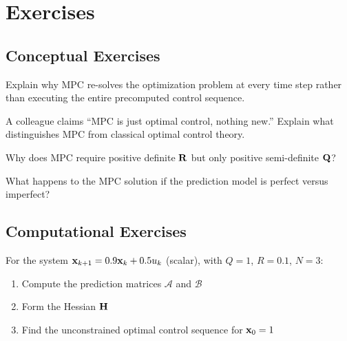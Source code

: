 \newpage
\section{Exercises}
\label{sec:exercises}

\subsection{Conceptual Exercises}

\begin{exercise}
Explain why MPC re-solves the optimization problem at every time step rather than executing the entire precomputed control sequence.
\end{exercise}

\begin{exercise}
A colleague claims ``MPC is just optimal control, nothing new.'' Explain what distinguishes MPC from classical optimal control theory.
\end{exercise}

\begin{exercise}
Why does MPC require positive definite $\mathbf{R}$ but only positive semi-definite $\mathbf{Q}$?
\end{exercise}

\begin{exercise}
What happens to the MPC solution if the prediction model is perfect versus imperfect?
\end{exercise}

\subsection{Computational Exercises}

\begin{exercise}
For the system $\mathbf{x}_{k+1} = 0.9\mathbf{x}_k + 0.5u_k$ (scalar), with $Q=1$, $R=0.1$, $N=3$:
\begin{enumerate}
    \item Compute the prediction matrices $\boldsymbol{\mathcal{A}}$ and $\boldsymbol{\mathcal{B}}$
    \item Form the Hessian $\mathbf{H}$
    \item Find the unconstrained optimal control sequence for $\mathbf{x}_0 = 1$
\end{enumerate}
\end{exercise}

